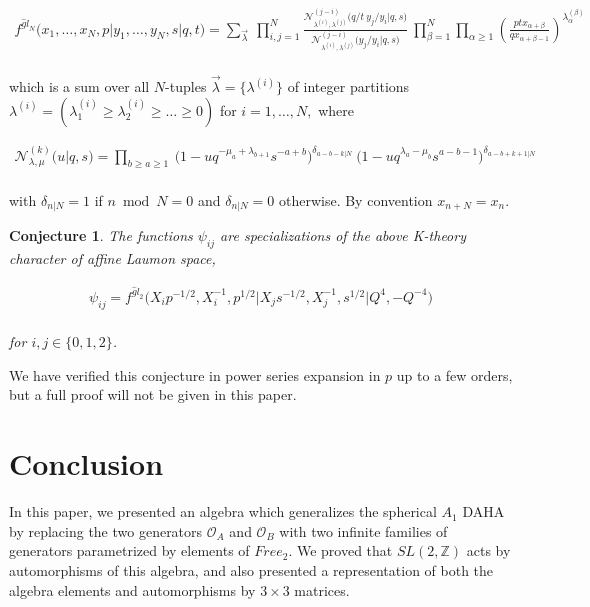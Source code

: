 \documentclass{amsart}
\newtheorem{conjecture}[theorem]{Conjecture}
\newcommand{\Oa}{\mathcal O_A}
\newcommand{\Ob}{\mathcal O_B}
\begin{document}
\begin{align*}
f^{{\widehat gl}_N} \big( x_1, \ldots, x_N, p \big\vert y_1, \ldots, y_N, s \big| q,t \big) = \sum\limits_{{\vec \lambda}} \ \prod\limits_{i,j = 1}^{N} \frac{{\mathcal N}_{\lambda^{(i)}, \lambda^{(j)}}^{(j-i)}\big( q/t \ y_j / y_i \vert q, s \big)}{{\mathcal N}_{\lambda^{(i)}, \lambda^{(j)}}^{(j-i)}\big( y_j / y_i \vert q,s \big)} \ \prod\limits_{\beta = 1}^{N} \prod\limits_{\alpha \geq 1} \left( \frac{p t x_{\alpha+\beta}}{q x_{\alpha+\beta-1}} \right)^{\lambda^{(\beta)}_\alpha}
\end{align*}
\smallskip\\
which is a sum over all $N$-tuples ${\vec \lambda} = \big\{ \lambda^{(i)} \big\}$ of integer partitions $\lambda^{(i)} = (\lambda^{(i)}_1 \geq \lambda^{(i)}_2 \geq \ldots \geq 0)$ for $i = 1, \ldots, N,$ where

\begin{align*}
{\mathcal N}_{\lambda, \mu}^{(k)}\big( u \vert q, s \big) =
\prod\limits_{b \geq a \geq 1} \ \big( 1 - u q^{-\mu_a + \lambda_{b+1}} s^{-a+b} \big)^{\delta_{a - b - k \vert N}} \ \big( 1 - u q^{\lambda_{a} - \mu_b} s^{a-b-1} \big)^{\delta_{a - b + k + 1 \vert N}}
\end{align*}
\smallskip\\
with $\delta_{n \vert N} = 1$ if $n \bmod N = 0$ and $\delta_{n \vert N} = 0$ otherwise. By convention $x_{n + N} = x_{n}$.

\begin{conjecture}
The functions $\psi_{ij}$ are specializations of the above K-theory character of affine Laumon space,

\begin{align*}
\psi_{ij} = f^{{\widehat gl}_2} \big( X_i p^{-1/2}, X_i^{-1}, p^{1/2} \big\vert X_j s^{-1/2}, X_j^{-1}, s^{1/2} \big| Q^4, -Q^{-4} \big)
\end{align*}
\smallskip\\
for $i,j \in \{0,1,2\}$.

\end{conjecture}

We have verified this conjecture in power series expansion in $p$ up to a few orders, but a full proof will not be given in this paper.

\section{Conclusion}
\label{sec:Conclusion}

In this paper, we presented an algebra which generalizes the spherical $A_1$ DAHA by replacing the two generators $\Oa$ and $\Ob$ with two infinite families of generators parametrized by elements of $Free_2$. We proved that $SL(2,{\mathbb Z})$ acts by automorphisms of this algebra, and also presented a representation of both the algebra elements and automorphisms by $3 \times 3$ matrices. 
\smallskip\\
\end{document}
